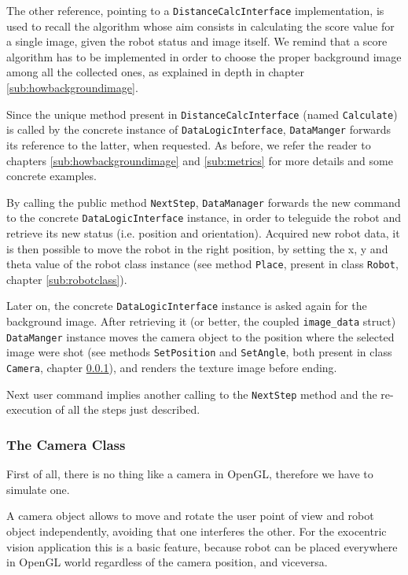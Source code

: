 %
The other reference, pointing to a \texttt{DistanceCalcInterface} implementation, is used to recall the algorithm
whose aim consists in calculating the score value for a single image, given the robot status and image itself. We
remind that a score algorithm has to be implemented in order to choose the proper background image among all the
collected ones, as explained in depth in chapter \ref{sub:howbackgroundimage}.
%

%
Since the unique method present in \texttt{DistanceCalcInterface} (named \texttt{Calculate}) is called by the
concrete instance of \texttt{DataLogicInterface}, \newline \texttt{DataManger} forwards its reference to the latter,
when requested. As before, we refer the reader to chapters \ref{sub:howbackgroundimage} and \ref{sub:metrics} for
more details and some concrete examples.
%

%
By calling the public method \texttt{NextStep}, \texttt{DataManager} forwards the new command to the concrete
\texttt{DataLogicInterface} instance, in order to teleguide the robot and retrieve its new status
(i.e. position and orientation). Acquired new robot data, it is then possible to move the robot in the
right position, by setting the x, y and theta value of the robot class instance (see method \texttt{Place},
present in class \texttt{Robot}, chapter \ref{sub:robotclass}).
%

%
Later on, the concrete \texttt{DataLogicInterface} instance is asked again for the background image. After
retrieving it (or better, the coupled \texttt{image\_data} struct) \texttt{DataManger} instance moves the camera
object to the position where the selected image were shot (see methods \texttt{SetPosition} and \texttt{SetAngle},
both present in class \texttt{Camera}, chapter \ref{sub:cameraclass}), and renders the texture image before ending.
%

%
Next user command implies another calling to the \texttt{NextStep} method and the re-execution of all the steps just
described.

\subsubsection{The Camera Class}
\label{sub:cameraclass}


First of all, there is no thing like a camera in OpenGL, therefore we have to
simulate one.
%

%
A camera object allows to move and rotate the user point of view and robot
object independently, avoiding that one interferes the other. For the exocentric
vision application this is a basic feature, because robot can be placed
everywhere in OpenGL world regardless of the camera position, and viceversa.
%

